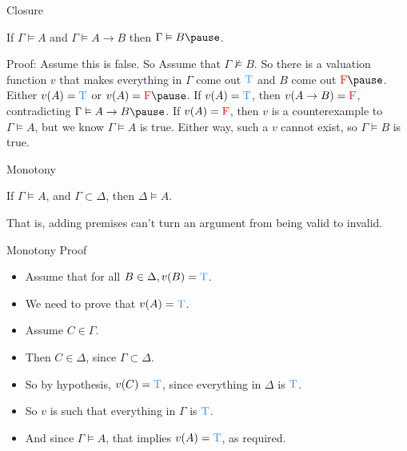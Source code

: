 \documentclass[
  ignorenonframetext,
]{beamer}
\providecommand{\tightlist}{%
  \setlength{\itemsep}{0pt}\setlength{\parskip}{0pt}}
\renewcommand{\,}{\text{, }}
\renewenvironment*{quote}	
	{\list{}{\rightmargin   \leftmargin} \item } 	
	{\endlist }
\def\True{\textcolor{dodgerblue}{\text{T}}}
\def\False{\textcolor{red}{\text{F}}}
\begin{document}
\begin{frame}{Closure}
\protect\hypertarget{closure}{}

\begin{quote}
If \(\Gamma \vDash A\) and \(\Gamma \vDash A \rightarrow B\) then
\(\Gamma \vDash B \pause\).
\end{quote}

Proof: Assume this is false. So Assume that \(\Gamma \nvDash B\). So
there is a valuation function \(v\) that makes everything in \(\Gamma\)
come out \(\True\) and \(B\) come out \(\False \pause\). Either
\(v(A) = \True\) or \(v(A) = \False \pause\). If \(v(A) = \True\), then
\(v(A \rightarrow B) = \False\), contradicting
\(\Gamma \vDash A \rightarrow B \pause\). If \(v(A) = \False\), then
\(v\) is a counterexample to \(\Gamma \vDash A\), but we know
\(\Gamma \vDash A\) is true. Either way, such a \(v\) cannot exist, so
\(\Gamma \vDash B\) is true.

\end{frame}

\begin{frame}{Monotony}
\protect\hypertarget{monotony}{}

\begin{quote}
If \(\Gamma \vDash A\), and \(\Gamma \subset \Delta\), then
\(\Delta \vDash A\).
\end{quote}

That is, adding premises can't turn an argument from being valid to
invalid.

\end{frame}

\begin{frame}{Monotony Proof}
\protect\hypertarget{monotony-proof}{}

\begin{itemize}
\tightlist
\item
  Assume that for all \(B \in \Delta, v(B) = \True\).
\item
  We need to prove that \(v(A) = \True\).\pause
\item
  Assume \(C \in \Gamma\).
\item
  Then \(C \in \Delta\), since \(\Gamma \subset \Delta\).\pause
\item
  So by hypothesis, \(v(C) = \True\), since everything in \(\Delta\) is
  \(\True\).\pause
\item
  So \(v\) is such that everything in \(\Gamma\) is \(\True\).\pause
\item
  And since \(\Gamma \vDash A\), that implies \(v(A) = \True\), as
  required.
\end{itemize}

\end{frame}
\end{document}
